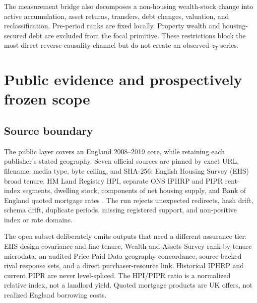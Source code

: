 \documentclass[11pt]{article}
\begin{document}
The measurement bridge also decomposes a non-housing wealth-stock change into
active accumulation, asset returns, transfers, debt changes, valuation, and
reclassification. Pre-period ranks are fixed locally. Property wealth and housing-
secured debt are excluded from the focal primitive. These restrictions block the
most direct reverse-causality channel but do not create an observed $z_T$ series.

\section{Public evidence and prospectively frozen scope}
\label{sec:data}

\subsection{Source boundary}

The public layer covers an England 2008--2019 core, while retaining each
publisher's stated geography. Seven official sources are pinned by exact URL,
filename, media type, byte ceiling, and SHA-256: English Housing Survey (EHS)
broad tenure, HM Land Registry HPI, separate ONS IPHRP and PIPR rent-index
segments, dwelling stock, components of net housing supply, and Bank of England
quoted mortgage rates \citep{ehs2025,hmlr2026,onsiphrp2025,onspipr2026,
mhclgstock2026,mhclgsupply2025,boequoted2026}. The run rejects unexpected redirects,
hash drift, schema drift, duplicate periods, missing registered support, and
non-positive index or rate domains.

The open subset deliberately omits outputs that need a different assurance tier:
EHS design covariance and fine tenure, Wealth and Assets Survey rank-by-tenure
microdata, an audited Price Paid Data geography concordance, source-backed rival
response sets, and a direct purchaser-resource link. Historical IPHRP and current
PIPR are never level-spliced. The HPI/PIPR ratio is a normalized relative index,
not a landlord yield. Quoted mortgage products are UK offers, not realized England
borrowing costs.
\end{document}
